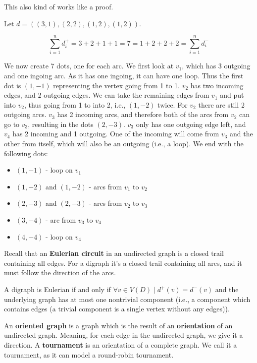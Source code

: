 \begin{example}
	This also kind of works like a proof.

	Let $d = ((3,1), (2,2), (1,2), (1,2))$.

	\begin{equation*}
		\sum_{i=1}^n d_{i}^{+} = 3 + 2 + 1 + 1 = 7 = 1 + 2 + 2+ 2 = \sum_{i=1}^n d_{i}^{-}
	\end{equation*}

	We now create 7 dots, one for each arc. We first look at $v_{1}$, which has 3 outgoing and one ingoing arc. As it has one ingoing, it can have one loop. Thus the first dot is $(1,-1)$ representing the vertex going from 1 to 1. $v_{2}$ has two incoming edges, and 2 outgoing edges. We can take the remaining edges from $v_{1}$ and put into $v_{2}$, thus going from 1 to into 2, i.e., $(1, -2)$ twice. For $v_{2}$ there are still 2 outgoing arcs. $v_{3}$ has 2 incoming arcs, and therefore both of the arcs from $v_{2}$ can go to $v_{3}$, resulting in the dots $(2, -3)$. $v_{3}$ only has one outgoing edge left, and $v_{4}$ has 2 incoming and 1 outgoing. One of the incoming will come from $v_{3}$ and the other from itself, which will also be an outgoing (i.e., a loop). We end with the following dots:
	\begin{itemize}
		\item $(1, -1)$ - loop on $v_{1}$
		\item $(1, -2)$ and $(1, -2)$ - arcs from $v_{1}$ to $v_{2}$
		\item $(2,-3)$ and $(2,-3)$ - arcs from $v_{2}$ to $v_{3}$
		\item $(3, -4)$ - arc from $v_{3}$ to $v_{4}$
		\item $(4,-4)$ - loop on $v_{4}$
	\end{itemize}
\end{example}

Recall that an \textbf{Eulerian circuit} in an undirected graph  is a closed trail containing all edges. For a digraph it's a closed trail containing all arcs, and it must follow the direction of the arcs.

\begin{theorem}
	A digraph is Eulerian if and only if $\forall v \in V(D) \mid d^{+}(v) = d^{-}(v)$ and the underlying graph has at most one nontrivial component (i.e., a component which contains edges (a trivial component is a single vertex without any edges)).
\end{theorem}

An \textbf{oriented graph} is a graph which is the result of an \textbf{orientation} of an undirected graph. Meaning, for each edge in the undirected graph, we give it a direction. A \textbf{tournament} is an orientation of a complete graph. We call it a tournament, as it can model a round-robin tournament.

